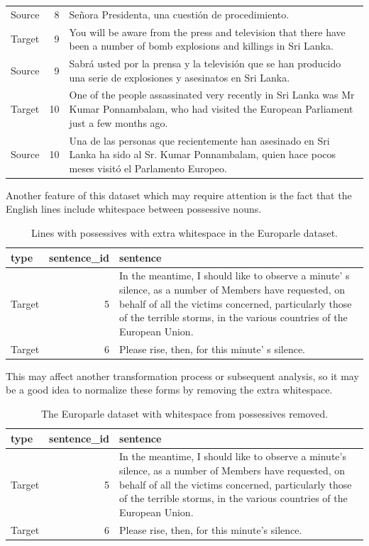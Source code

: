 \documentclass[
]{article}
\begin{document}
\begin{table}
\begin{tabular}[t]{lrl}
Source & 8 & Señora Presidenta, una cuestión de procedimiento.\\
Target & 9 & You will be aware from the press and television that there have been a number of bomb explosions and killings in Sri Lanka.\\
Source & 9 & Sabrá usted por la prensa y la televisión que se han producido una serie de explosiones y asesinatos en Sri Lanka.\\
Target & 10 & One of the people assassinated very recently in Sri Lanka was Mr Kumar Ponnambalam, who had visited the European Parliament just a few months ago.\\
\addlinespace
Source & 10 & Una de las personas que recientemente han asesinado en Sri Lanka ha sido al Sr. Kumar Ponnambalam, quien hace pocos meses visitó el Parlamento Europeo.\\
\bottomrule
\end{tabular}
\end{table}

Another feature of this dataset which may require attention is the fact that the English lines include whitespace between possessive nouns.

\begin{table}

\caption{\label{tab:normalize-whitespace-identify-europarle}Lines with possessives with extra whitespace in the Europarle dataset.}
\centering
\begin{tabular}[t]{lrl}
\toprule
type & sentence\_id & sentence\\
\midrule
Target & 5 & In the meantime, I should like to observe a minute' s silence, as a number of Members have requested, on behalf of all the victims concerned, particularly those of the terrible storms, in the various countries of the European Union.\\
Target & 6 & Please rise, then, for this minute' s silence.\\
\bottomrule
\end{tabular}
\end{table}

This may affect another transformation process or subsequent analysis, so it may be a good idea to normalize these forms by removing the extra whitespace.

\begin{table}

\caption{\label{tab:normalize-whitespace-remove-europarle}The Europarle dataset with whitespace from possessives removed.}
\centering
\begin{tabular}[t]{lrl}
\toprule
type & sentence\_id & sentence\\
\midrule
Target & 5 & In the meantime, I should like to observe a minute's silence, as a number of Members have requested, on behalf of all the victims concerned, particularly those of the terrible storms, in the various countries of the European Union.\\
Target & 6 & Please rise, then, for this minute's silence.\\
\bottomrule
\end{tabular}
\end{table}
\end{document}
